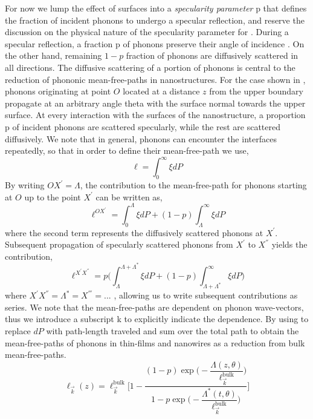 \par 
For now we lump the effect of surfaces into a \textit{specularity parameter} \gls{p} that defines the fraction of incident phonons to undergo a specular reflection, and reserve the discussion on the physical nature of the specularity parameter for . During a specular reflection, a fraction \gls{p} of phonons preserve their angle of incidence \cite{book_Ziman}. On the other hand, remaining $1-p$  fraction of phonons are diffusively scattered in all directions. The diffusive scattering of a portion of phonons is central to the reduction of phononic mean-free-paths in nanostructures. For the case shown in , phonons originating at point $O$ located at a distance $z$ from the upper boundary propagate at an arbitrary angle \gls{theta} with the surface normal towards the upper surface. At every interaction with the surfaces of the nanostructure, a proportion \gls{p} of incident phonons are scattered specularly, while the rest are scattered diffusively. We note that in general, phonons can encounter the interfaces repeatedly, so that in order to define their mean-free-path we use,
\begin{equation}
\ell=\int_{0}^{\infty}\xi dP
\end{equation}
By writing $OX^{'}=\Lambda$, the contribution to the mean-free-path for phonons starting at $O$ up to the point $X^{'}$ can be written as,
\begin{equation}
\ell^{{OX^{'}}}=\int_{0}^{\Lambda}{\xi dP} + (1-p)\int_{\Lambda}^{\infty}{\xi dP}
\end{equation}
where the second term represents the diffusively scattered phonons at $X^{'}$. Subsequent propagation of specularly scattered phonons from $X^{'}$ to $X^{''}$ yields the contribution,
\begin{equation}
\ell^{{X^{'}X^{''}}}=p \Bigg( \int_{\Lambda}^{\Lambda+\Lambda^*}{\xi dP} + (1-p)\int_{\Lambda+\Lambda^*}^{\infty}{\xi dP} \Bigg)
\end{equation}
where $X^{'}X^{''}=\Lambda^*=X^{'''}=...$ , allowing us to write subsequent contributions as series. We note that the mean-free-paths are dependent on phonon wave-vectors, thus we introduce a subscript \gls{k} to explicitly indicate the dependence. By using  to replace $dP$ with path-length traveled and sum over the total path to obtain the mean-free-paths of phonons in thin-films and nanowires as a reduction from bulk mean-free-paths.
\begin{equation}
\ell_{\vec{k}}(z)= \ell_{\vec{k}}^{\text{bulk}} \Bigg[ 1 - \dfrac{(1-p)\exp\Big(-\dfrac{\Lambda(z,\theta)}{\ell_{\vec{k}}^{\text{bulk}}}\Big)}{1-p\exp\Big(-\dfrac{\Lambda^*(t,\theta)}{\ell_{\vec{k}}^{\text{bulk}}}\Big)} \Bigg]
\label{eq:ch2-mfp_reduced}
\end{equation}

